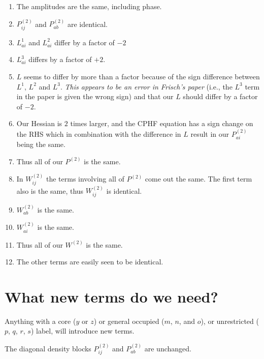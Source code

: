 \documentclass[fleqn,12pt]{article}
\newcommand{\Ptwo}{P^{(2)}}
\newcommand{\Wtwo}{W^{(2)}}
\begin{document}
\begin{enumerate}
\item The amplitudes are the same, including phase.

\item $\Ptwo_{ij}$ and $\Ptwo_{ab}$ are identical.

\item $L^1_{ai}$ and $L^2_{ai}$ differ by a factor of $-2$

\item $L^3_{ai}$ differs by a factor of $+2$.

\item $L$ seems to differ by more than a factor because of the sign
  difference between $L^1$, $L^2$ and $L^3$.  {\em This appears to be
    an error in Frisch's paper} (i.e., the $L^3$ term in the paper is
  given the wrong sign) and that our $L$ should differ by a factor of
  $-2$.

\item Our Hessian is $2$ times larger, and the CPHF equation has a sign
  change on the RHS which in combination with the difference in $L$
  result in our $\Ptwo_{ai}$ being the same.

\item Thus all of our $\Ptwo$ is the same.

\item In $\Wtwo_{ij}$ the terms involving all of $\Ptwo$ come out the
  same.  The first term also is the same, thus $\Wtwo_{ij}$ is
  identical.

\item $\Wtwo_{ab}$ is the same.

\item $\Wtwo_{ai}$ is the same.

\item Thus all of our $\Wtwo$ is the same.

\item The other terms are easily seen to be identical.

\end{enumerate}

\section{What new terms do we need?}

Anything with a core ($y$ or $z$) or general occupied ($m$, $n$, and
$o$), or unrestricted ($p$, $q$, $r$, $s$) label, will introduce new
terms.  

The diagonal density blocks $\Ptwo_{ij}$ and $\Ptwo_{ab}$ are
unchanged.
\end{document}

